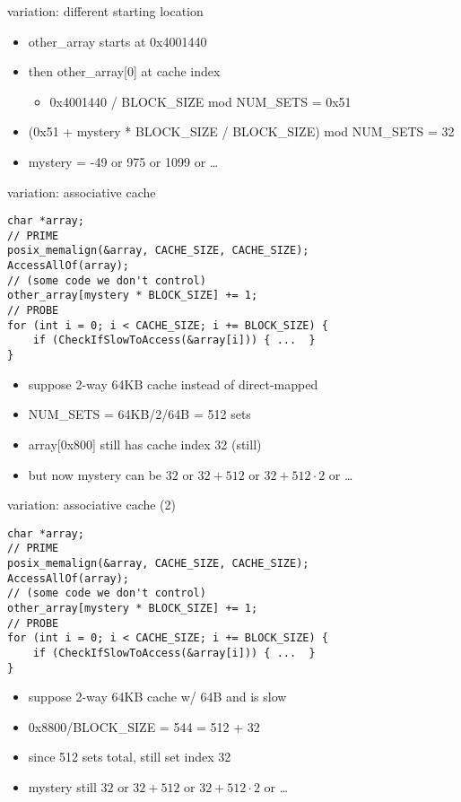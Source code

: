 

\begin{frame}{variation: different starting location}
    \begin{itemize}
    \item other\_array starts at 0x4001440
    \item then other\_array[0] at cache index
        \begin{itemize}
        \item 0x4001440 / BLOCK\_SIZE mod NUM\_SETS = 0x51
        \end{itemize}
    \item (0x51 + mystery * BLOCK\_SIZE / BLOCK\_SIZE) mod NUM\_SETS = 32
    \item mystery = -49 or 975 or 1099 or \ldots
    \end{itemize}
\end{frame}

\begin{frame}[fragile]{variation: associative cache}
\begin{Verbatim}[fontsize=\fontsize{9}{10}]
char *array;
// PRIME
posix_memalign(&array, CACHE_SIZE, CACHE_SIZE);
AccessAllOf(array);
// (some code we don't control)
other_array[mystery * BLOCK_SIZE] += 1;
// PROBE
for (int i = 0; i < CACHE_SIZE; i += BLOCK_SIZE) {
    if (CheckIfSlowToAccess(&array[i])) { ...  }
}
\end{Verbatim}
    \begin{itemize}
    \item suppose 2-way 64KB cache instead of direct-mapped
    \item NUM\_SETS = 64KB/2/64B = 512 sets
    \item array[0x800] still has cache index 32 (still)
    \item but now mystery can be $32$ or $32+512$ or $32+512\cdot2$ or \ldots
    \end{itemize}
\end{frame}

\begin{frame}[fragile]{variation: associative cache (2)}
\begin{Verbatim}[fontsize=\fontsize{9}{10}]
char *array;
// PRIME
posix_memalign(&array, CACHE_SIZE, CACHE_SIZE);
AccessAllOf(array);
// (some code we don't control)
other_array[mystery * BLOCK_SIZE] += 1;
// PROBE
for (int i = 0; i < CACHE_SIZE; i += BLOCK_SIZE) {
    if (CheckIfSlowToAccess(&array[i])) { ...  }
}
\end{Verbatim}
    \begin{itemize}
    \item suppose 2-way 64KB cache w/ 64B and  is slow
    \item 0x8800/BLOCK\_SIZE = 544 = 512 + 32
    \item since 512 sets total, still set index 32
    \item mystery still $32$ or $32+512$ or $32+512\cdot2$ or \ldots
    \end{itemize}
\end{frame}

